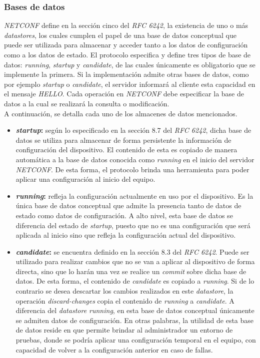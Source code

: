   \subsubsection{Bases de datos}
  \textit{NETCONF} define en la sección cinco del \textit{RFC 6242}, la existencia de uno o más \textit{datastores}, los cuales cumplen el papel de una base de datos conceptual que puede ser utilizada para almacenar y acceder tanto a los datos de configuración como a los datos de estado. El protocolo especifica y define tres tipos de base de datos: \textit{running}, \textit{startup} y \textit{candidate}, de las cuales únicamente es obligatorio que se implemente la primera. Si la implementación admite otras bases de datos, como por ejemplo \textit{startup} o \textit{candidate}, el servidor informará al cliente esta capacidad en el mensaje \textit{HELLO}. Cada operación en \textit{NETCONF} debe especificar la base de datos a la cual se realizará la consulta o modificación.
  \\

  A continuación, se detalla cada uno de los almacenes de datos mencionados.
\begin{itemize}
	\item \textbf{\textit{startup}:} según lo especificado en la sección 8.7 del \textit{RFC 6242}, dicha base de datos se utiliza para almacenar de forma persistente la información de configuración del dispositivo. El contenido de esta es copiado de manera automática a la base de datos conocida como \textit{running} en el inicio del servidor \textit{NETCONF}. De esta forma, el protocolo brinda una herramienta para poder aplicar una configuración al inicio del equipo. 
	\item \textbf{\textit{running}:} refleja la configuración actualmente en uso por el dispositivo. Es la única base de datos conceptual que admite la presencia tanto de datos de estado como datos de configuración. A alto nivel, esta base de datos se diferencia del estado de \textit{startup}, puesto que no es una configuración que será aplicada al inicio sino que refleja la configuración actual del dispositivo.
	\item \textbf{\textit{candidate}:} se encuentra definido en la sección 8.3 del \textit{RFC 6242}. Puede ser utilizado para realizar cambios que no se van a aplicar al dispositivo de forma directa, sino que lo harán una vez se realice un \textit{commit} sobre dicha base de datos. De esta forma, el contenido de \textit{candidate} es copiado a \textit{running}. Si de lo contrario se desea descartar los cambios realizados en este \textit{datastore}, la operación \textit{discard-changes} copia el contenido de \textit{running} a \textit{candidate}. A diferencia del \textit{datastore running}, en esta base de datos conceptual únicamente se admiten datos de configuración. En otras palabras, la utilidad de esta base de datos reside en que permite brindar al administrador un entorno de pruebas, donde se podría aplicar una configuración temporal en el equipo, con capacidad de volver a la configuración anterior en caso de fallas.
\end{itemize}


